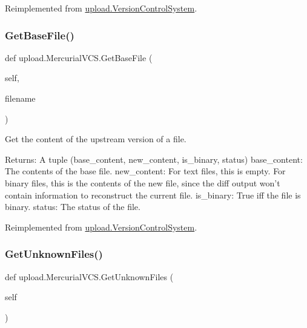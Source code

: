 Reimplemented from \mbox{\hyperlink{classupload_1_1VersionControlSystem_adfd9d4ecba422102233a2ba13e5bfaf5}{upload.\+Version\+Control\+System}}.

\mbox{\label{classupload_1_1MercurialVCS_a0cdc0cbe6ac4daab82f5f01e6ae2e670}} 
\subsubsection{\texorpdfstring{GetBaseFile()}{GetBaseFile()}\hspace{0.1cm}{\footnotesize\ttfamily [2/2]}}
{\footnotesize\ttfamily def upload.\+Mercurial\+V\+C\+S.\+Get\+Base\+File (\begin{DoxyParamCaption}\item[{}]{self,  }\item[{}]{filename }\end{DoxyParamCaption})}

\begin{DoxyVerb}Get the content of the upstream version of a file.

Returns:
  A tuple (base_content, new_content, is_binary, status)
base_content: The contents of the base file.
new_content: For text files, this is empty.  For binary files, this is
  the contents of the new file, since the diff output won't contain
  information to reconstruct the current file.
is_binary: True iff the file is binary.
status: The status of the file.
\end{DoxyVerb}
 

Reimplemented from \mbox{\hyperlink{classupload_1_1VersionControlSystem_adfd9d4ecba422102233a2ba13e5bfaf5}{upload.\+Version\+Control\+System}}.

\mbox{\label{classupload_1_1MercurialVCS_a6190899fb86cd09ad84cc5d4b0ebd2f3}} 
\subsubsection{\texorpdfstring{GetUnknownFiles()}{GetUnknownFiles()}\hspace{0.1cm}{\footnotesize\ttfamily [1/2]}}
{\footnotesize\ttfamily def upload.\+Mercurial\+V\+C\+S.\+Get\+Unknown\+Files (\begin{DoxyParamCaption}\item[{}]{self }\end{DoxyParamCaption})}

